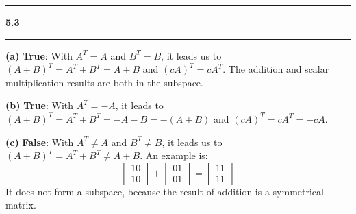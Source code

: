 \documentclass[11pt]{article}
\newcommand\question[2]{\vspace{.25in}\hrule\textbf{#1 #2}\vspace{.5em}\hrule\vspace{.10in}}
\renewcommand\part[1]{\vspace{.10in}\textbf{(#1)}}
\begin{document}
\question{5.3}{}
\part{a} \textbf{True}: With \(A^T = A\) and \(B^T = B\), it leads us to \((A + B)^{T} = A^T + B^T = A + B\) and \((cA)^T = cA^T\). The addition and scalar multiplication results are both in the subspace. 

\part{b} \textbf{True}: With \(A^T = -A\), it leads to \((A + B)^T = A^T + B^T= -A - B = - (A + B) \) and \((cA)^T = cA^T = -cA\).

\part{c} \textbf{False}: With \(A^T \neq A\) and \(B^T \neq B\), it leads us to \((A + B)^{T} = A^T + B^T \neq A + B\). An example is:
$$\begin{bmatrix} 1 0 \\ 1 0 \end{bmatrix} + \begin{bmatrix} 0 1 \\ 0 1 \end{bmatrix} = \begin{bmatrix} 1 1 \\ 1 1 \end{bmatrix}$$
It does not form a subspace, because the result of addition is a symmetrical matrix.
\end{document}
